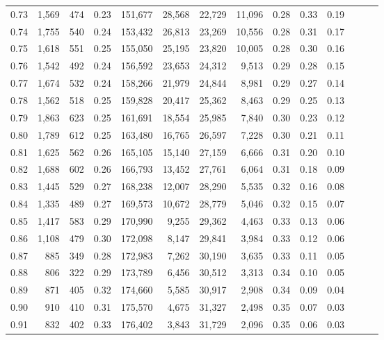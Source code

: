 \begin{tabular}{rrrrrrrrrrrrrr}
0.73 &  1,569 &  474 &  0.23 &  151,677 &   28,568 &  22,729 &  11,096 &  0.28 &  0.33 &      0.19 \\
0.74 &  1,755 &  540 &  0.24 &  153,432 &   26,813 &  23,269 &  10,556 &  0.28 &  0.31 &      0.17 \\
0.75 &  1,618 &  551 &  0.25 &  155,050 &   25,195 &  23,820 &  10,005 &  0.28 &  0.30 &      0.16 \\
0.76 &  1,542 &  492 &  0.24 &  156,592 &   23,653 &  24,312 &   9,513 &  0.29 &  0.28 &      0.15 \\
0.77 &  1,674 &  532 &  0.24 &  158,266 &   21,979 &  24,844 &   8,981 &  0.29 &  0.27 &      0.14 \\
0.78 &  1,562 &  518 &  0.25 &  159,828 &   20,417 &  25,362 &   8,463 &  0.29 &  0.25 &      0.13 \\
0.79 &  1,863 &  623 &  0.25 &  161,691 &   18,554 &  25,985 &   7,840 &  0.30 &  0.23 &      0.12 \\
0.80 &  1,789 &  612 &  0.25 &  163,480 &   16,765 &  26,597 &   7,228 &  0.30 &  0.21 &      0.11 \\
0.81 &  1,625 &  562 &  0.26 &  165,105 &   15,140 &  27,159 &   6,666 &  0.31 &  0.20 &      0.10 \\
0.82 &  1,688 &  602 &  0.26 &  166,793 &   13,452 &  27,761 &   6,064 &  0.31 &  0.18 &      0.09 \\
0.83 &  1,445 &  529 &  0.27 &  168,238 &   12,007 &  28,290 &   5,535 &  0.32 &  0.16 &      0.08 \\
0.84 &  1,335 &  489 &  0.27 &  169,573 &   10,672 &  28,779 &   5,046 &  0.32 &  0.15 &      0.07 \\
0.85 &  1,417 &  583 &  0.29 &  170,990 &    9,255 &  29,362 &   4,463 &  0.33 &  0.13 &      0.06 \\
0.86 &  1,108 &  479 &  0.30 &  172,098 &    8,147 &  29,841 &   3,984 &  0.33 &  0.12 &      0.06 \\
0.87 &    885 &  349 &  0.28 &  172,983 &    7,262 &  30,190 &   3,635 &  0.33 &  0.11 &      0.05 \\
0.88 &    806 &  322 &  0.29 &  173,789 &    6,456 &  30,512 &   3,313 &  0.34 &  0.10 &      0.05 \\
0.89 &    871 &  405 &  0.32 &  174,660 &    5,585 &  30,917 &   2,908 &  0.34 &  0.09 &      0.04 \\
0.90 &    910 &  410 &  0.31 &  175,570 &    4,675 &  31,327 &   2,498 &  0.35 &  0.07 &      0.03 \\
0.91 &    832 &  402 &  0.33 &  176,402 &    3,843 &  31,729 &   2,096 &  0.35 &  0.06 &      0.03 \\

\end{tabular}
